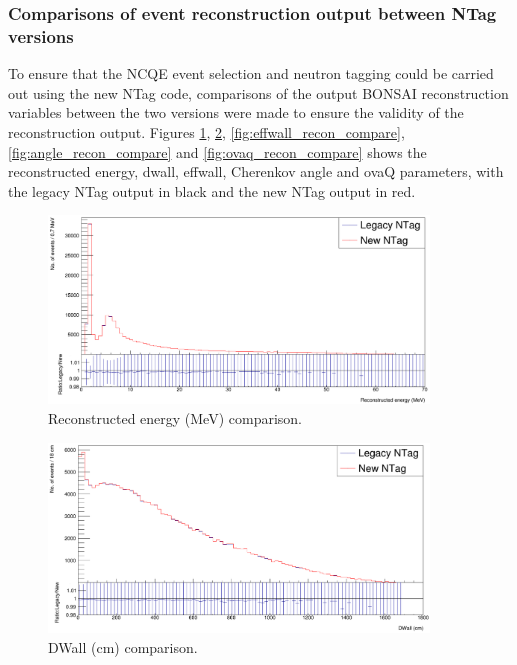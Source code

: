 \subsubsection{Comparisons of event reconstruction output between NTag versions}
To ensure that the NCQE event selection and neutron tagging could be carried out using the new NTag code, comparisons of the output BONSAI reconstruction variables between the two versions were made to ensure the validity of the reconstruction output. Figures \ref{fig:energy_recon_compare}, \ref{fig:dwall_recon_compare}, \ref{fig:effwall_recon_compare}, \ref{fig:angle_recon_compare} and \ref{fig:ovaq_recon_compare}  shows the reconstructed energy, dwall, effwall, Cherenkov angle and ovaQ parameters, with the legacy NTag output in black and the new NTag output in red. 


\begin{figure}[htp]
        \centering
        \includegraphics[width=0.9\textwidth]{Figures/energy_recon_compare.PNG}
        \caption{Reconstructed energy (MeV) comparison.}
        \label{fig:energy_recon_compare}    
\end{figure}

\begin{figure}
    \centering
    \includegraphics[width=0.9\textwidth]{Figures/dwall_recon_compare.PNG}
    \caption{DWall (cm) comparison.}
    \label{fig:dwall_recon_compare}

\end{figure}

